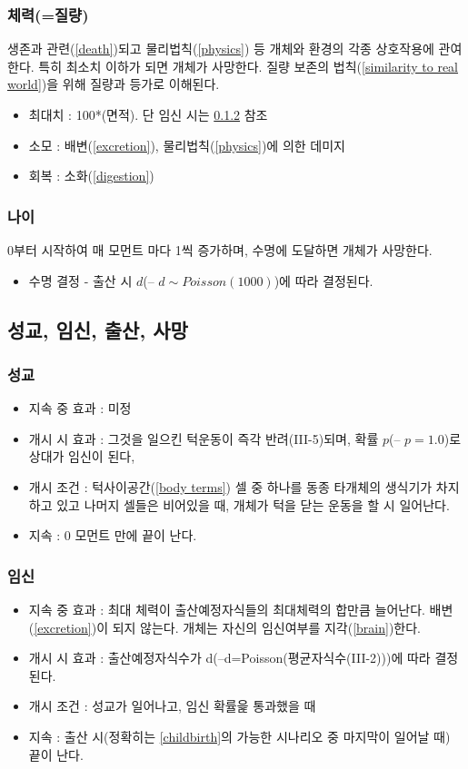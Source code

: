 \documentclass[a4paper,12pt]{article}
\begin{document}
\subsubsection{체력(=질량)}\label{hp}
생존과 관련(\ref{death})되고 물리법칙(\ref{physics}) 등 개체와 환경의 각종 상호작용에 관여한다. 특히 최소치 이하가 되면 개체가 사망한다. 
질량 보존의 법칙(\ref{similarity to real world})을 위해 질량과 등가로 이해된다. 
\begin{itemize}
\item 최대치 : 100*(면적). 단 임신 시는 \ref{pregnancy} 참조 

\item 소모 :  배변(\ref{excretion}), 물리법칙(\ref{physics})에 의한 데미지 

\item 회복 : 소화(\ref{digestion})
\end{itemize}
\subsubsection{나이}\label{age}
0부터 시작하여 매 모먼트 마다 1씩 증가하며, 수명에 도달하면 개체가 사망한다. 
\begin{itemize}
\item 수명 결정 - 출산 시 $d$(-- $d\sim Poisson(1000)$)에 따라 결정된다.  
\end{itemize}

\subsection{성교, 임신, 출산, 사망} 
\subsubsection{성교}\label{intercourse}
\begin{itemize} 
\item 지속 중 효과 : 미정 
\item 개시 시 효과 : 그것을 일으킨 턱운동이 즉각 반려(III-5)되며, 확률 $p$(-- $p=1.0$)로 상대가 임신이 된다, 
\item 개시 조건 : 턱사이공간(\ref{body terms}) 셀 중 하나를 동종 타개체의 생식기가 차지하고 있고 나머지 셀들은 비어있을 때, 개체가 턱을 닫는 운동을 할 시 일어난다. 
\item 지속 :  0 모먼트 만에 끝이 난다. 
\end{itemize} 
\subsubsection{임신}\label{pregnancy}
\begin{itemize} 
\item 지속 중 효과 : 최대 체력이 출산예정자식들의 최대체력의 합만큼 늘어난다. 배변(\ref{excretion})이 되지 않는다. 개체는 자신의 임신여부를 지각(\ref{brain})한다. 
\item 개시 시 효과 : 출산예정자식수가 d(--d=Poisson(평균자식수(III-2)))에 따라 결정된다. 
\item 개시 조건 : 성교가 일어나고, 임신 확률읉 통과했을 때 
\item 지속 : 출산 시(정확히는 \ref{childbirth}의 가능한 시나리오 중 마지막이 일어날 때) 끝이 난다. 
\end{itemize}
\end{document}
